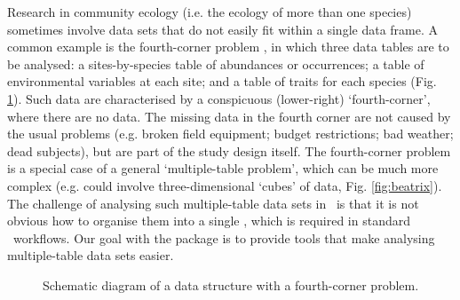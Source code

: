 \documentclass[a4paper]{report}
\begin{document}
\begin{article}
Research in community ecology (i.e. the ecology of more than one species) sometimes involve data sets that do not easily fit within a single data frame.  A common example is the fourth-corner problem \citep{LegendreEtAl1997}, in which three data tables are to be analysed: a sites-by-species table of abundances or occurrences; a table of environmental variables at each site; and a table of traits for each species (Fig. \ref{fig:fourth}).  Such data are characterised by a conspicuous (lower-right) `fourth-corner', where there are no data.  The missing data in the fourth corner are not caused by the usual problems (e.g. broken field equipment; budget restrictions; bad weather; dead subjects), but are part of the study design itself.  The fourth-corner problem is a special case of a general `multiple-table problem', which can be much more complex (e.g. could involve three-dimensional `cubes' of data, Fig. \ref{fig:beatrix}).  The challenge of analysing such multiple-table data sets in \R\ is that it is not obvious how to organise them into a single , which is required in standard \R\ workflows.  Our goal with the  package is to provide tools that make analysing multiple-table data sets easier.

\begin{figure}
\vspace{0.5cm}
\vspace{-1.5cm}
\caption{Schematic diagram of a data structure with a fourth-corner problem.} 
\label{fig:fourth}
\end{figure}


\end{article}
\end{document}
